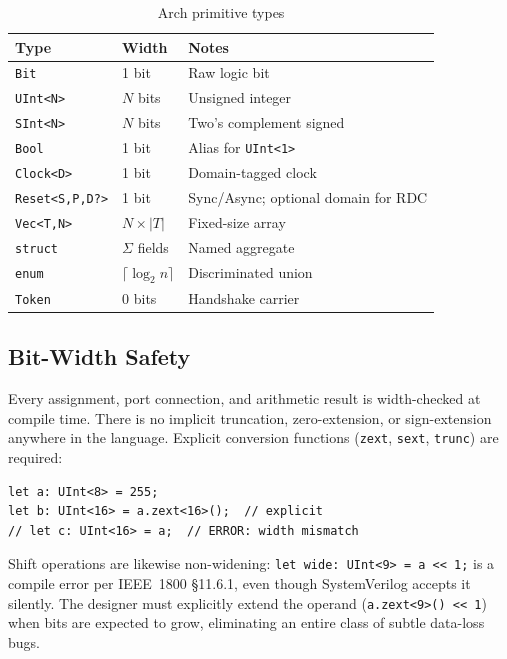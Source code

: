 \documentclass[11pt,twocolumn]{article}
\begin{document}
\begin{table}[t]
\centering
\caption{Arch primitive types}
\label{tab:types}
\footnotesize
\begin{tabular}{@{}llp{3.1cm}@{}}
\toprule
\textbf{Type} & \textbf{Width} & \textbf{Notes} \\
\midrule
\texttt{Bit}             & 1 bit & Raw logic bit \\
\texttt{UInt<N>}         & $N$ bits & Unsigned integer \\
\texttt{SInt<N>}         & $N$ bits & Two's complement signed \\
\texttt{Bool}            & 1 bit & Alias for \texttt{UInt<1>} \\
\texttt{Clock<D>}        & 1 bit & Domain-tagged clock \\
\texttt{Reset<S,P,D?>}   & 1 bit & Sync/Async; optional domain for RDC \\
\texttt{Vec<T,N>}        & $N \times |T|$ & Fixed-size array \\
\texttt{struct}          & $\Sigma$ fields & Named aggregate \\
\texttt{enum}            & $\lceil\log_2 n\rceil$ & Discriminated union \\
\texttt{Token}           & 0 bits & Handshake carrier \\
\bottomrule
\end{tabular}
\end{table}

\subsection{Bit-Width Safety}

Every assignment, port connection, and arithmetic result is width-checked at compile time. There is no implicit truncation, zero-extension, or sign-extension anywhere in the language. Explicit conversion functions (\texttt{zext}, \texttt{sext}, \texttt{trunc}) are required:

\begin{lstlisting}[language=Arch,caption={Explicit width conversion},label={lst:width}]
let a: UInt<8> = 255;
let b: UInt<16> = a.zext<16>();  // explicit
// let c: UInt<16> = a;  // ERROR: width mismatch
\end{lstlisting}

Shift operations are likewise non-widening: \texttt{let wide: UInt<9> = a << 1;} is a compile error per IEEE~1800 §11.6.1, even though SystemVerilog accepts it silently. The designer must explicitly extend the operand (\texttt{a.zext<9>() << 1}) when bits are expected to grow, eliminating an entire class of subtle data-loss bugs.
\end{document}
